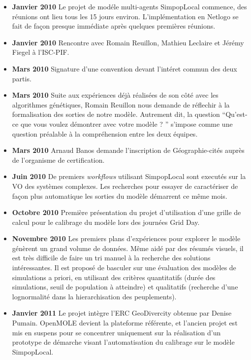 \begin{itemize}[label=\textbullet]
\item {\textbf{Janvier 2010}} Le projet de modéle multi-agents SimpopLocal commence, des réunions ont lieu tous les 15 jours environ. L'implémentation en Netlogo se fait de façon presque immédiate après quelques premières réunions.
\item {\textbf{Janvier 2010}} Rencontre avec Romain Reuillon, Mathieu Leclaire et Jérémy Fiegel à l'ISC-PIF.
\item {\textbf{Mars 2010}} Signature d'une convention devant l'intéret commun des deux partis.
\item {\textbf{Mars 2010}} Suite aux expériences déjà réalisées de son côté avec les algorithmes génétiques, Romain Reuillon nous demande de réflechir à la formalisation des sorties de notre modèle. Autrement dit, la question \enquote{Qu'est-ce que vous voulez démontrer avec votre modèle ? } s'impose comme une question préalable à la compréhension entre les deux équipes.
\item {\textbf{Mars 2010}} Arnaud Banos demande l'inscription de Géographie-cités auprès de l'organisme de certification.
\item {\textbf{Juin 2010}} De premiers \textit{workflows} utilisant SimpopLocal sont executés sur la VO des systèmes complexes. Les recherches pour essayer de caractériser de façon plus automatique les sorties du modèle démarrent ce même mois.

\item {\textbf{Octobre 2010}} Première présentation du projet d'utilisation d'une grille de calcul pour le calibrage du modèle lors des journées Grid Day.

\item {\textbf{Novembre 2010}} Les premiers plans d'expériences pour explorer le modèle génèrent un grand volume de données. Même aidé par des résumés visuels, il est très difficile de faire un tri manuel à la recherche des solutions intéressantes. Il est proposé de basculer sur une évaluation des modèles de simulations a priori, en utilisant des critères quantitatifs (durée des simulations, seuil de population à atteindre) et qualitatifs (recherche d'une lognormalité dans la hierarchisation des peuplements).

\item {\textbf{Janvier 2011}} Le projet intègre l'ERC GeoDivercity obtenue par Denise Pumain. OpenMOLE devient la plateforme référente, et l'ancien projet est mis en suspens pour se concentrer uniquement sur la réalisation d'un prototype de démarche visant l'automatisation du calibrage sur le modèle SimpopLocal.


\end{itemize}
